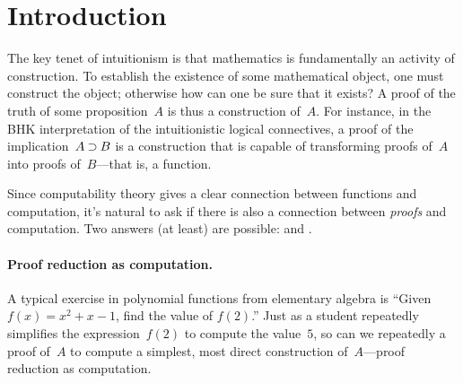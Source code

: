 \section{Introduction}\label{sec:introduction}

The key tenet of intuitionism
is that mathematics is fundamentally an activity of construction.
To establish the existence of some mathematical object, one must construct the object; otherwise how can one be sure that it exists?
A proof of the truth of some proposition~$A$ is thus a construction of~$A$.
%
%
For instance, in the \acf{BHK} interpretation of the intuitionistic logical connectives, a proof of the implication~$A \mathbin{\supset} B$ is a construction that is capable of transforming proofs of~$A$ into proofs of~$B$---that is, a function.

Since computability theory gives a clear connection between functions and computation,
it's natural to ask if there is also a connection between \emph{proofs} and computation.
Two answers (at least) are possible:  and .


\paragraph*{Proof reduction as computation.}
A typical exercise in polynomial functions from elementary algebra is \enquote{Given $f(x) = x^2 + x - 1$, find the value of $f(2)$.}
Just as a student repeatedly simplifies the expression~$f(2)$ to compute the value~$5$, so can we repeatedly  a proof of~$A$ to compute a simplest, most direct construction of~$A$---proof reduction as computation.  

